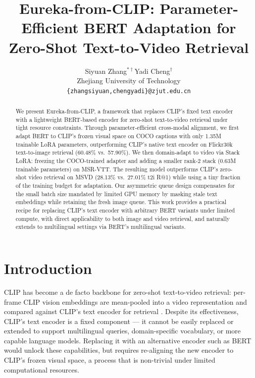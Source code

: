 \documentclass[10pt,leqno]{amsart}
\begin{document}
\title{Eureka-from-CLIP: Parameter-Efficient BERT Adaptation for Zero-Shot Text-to-Video Retrieval}

\author{Siyuan Zhang$^{*\dagger}$\quad Yadi Cheng$^{\dagger}$\\[4pt]
  \small Zhejiang University of Technology\\
  \small\texttt{\{zhangsiyuan,chengyadi\}@zjut.edu.cn}}


\maketitle

\let\thefootnote\relax
{}

\begin{abstract}
We present Eureka-from-CLIP, a framework that replaces CLIP's fixed text encoder with a lightweight BERT-based encoder for zero-shot text-to-video retrieval under tight resource constraints. Through parameter-efficient cross-modal alignment, we first adapt BERT to CLIP's frozen visual space on COCO captions with only 1.35M trainable LoRA \citep{hu2022lora} parameters, outperforming CLIP's native text encoder on Flickr30k \citep{plummer2015flickr30k} text-to-image retrieval (60.48\% vs.~57.90\%). We then domain-adapt to video via Stack LoRA: freezing the COCO-trained adapter and adding a smaller rank-2 stack (0.63M trainable parameters) on MSR-VTT. The resulting model outperforms CLIP's zero-shot video retrieval on MSVD (28.13\% vs.~27.01\% t2i R@1) while using a tiny fraction of the training budget for adaptation. Our asymmetric queue design compensates for the small batch size mandated by limited GPU memory by masking stale text embeddings while retaining the fresh image queue. This work provides a practical recipe for replacing CLIP's text encoder with arbitrary BERT variants under limited compute, with direct applicability to both image and video retrieval, and naturally extends to multilingual settings via BERT's multilingual variants.
\end{abstract}

\bigskip

\section{Introduction}

CLIP \citep{radford2021clip} has become a de facto backbone for zero-shot text-to-video retrieval: per-frame CLIP vision embeddings are mean-pooled into a video representation and compared against CLIP's text encoder for retrieval \citep{luo2022clip4clip}. Despite its effectiveness, CLIP's text encoder is a fixed component --- it cannot be easily replaced or extended to support multilingual queries, domain-specific vocabulary, or more capable language models. Replacing it with an alternative encoder such as BERT \citep{devlin2019bert} would unlock these capabilities, but requires re-aligning the new encoder to CLIP's frozen visual space, a process that is non-trivial under limited computational resources.
\end{document}
